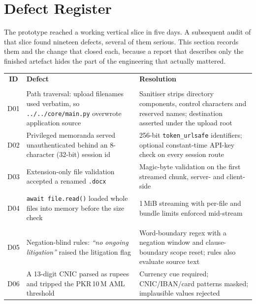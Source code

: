 \documentclass[11pt,a4paper]{article}
\newcommand{\code}[1]{\texttt{\small #1}}
\newcommand{\pkr}{PKR\,}
\begin{document}
\section{Defect Register}
\label{sec:defects}

The prototype reached a working vertical slice in five days. A subsequent audit of that
slice found nineteen defects, several of them serious. This section records them and the
change that closed each, because a report that describes only the finished artefact hides
the part of the engineering that actually mattered.

\begin{table}[H]
\centering\scriptsize
\begin{tabularx}{\linewidth}{@{}>{\ttfamily}c L{5.5cm} X@{}}
\toprule
{}\normalfont\textbf{ID} & \textbf{Defect} & \textbf{Resolution} \\
 \\
\midrule
D01 & Path traversal: upload filenames used verbatim, so \code{../../core/main.py} overwrote application source & Sanitiser strips directory components, control characters and reserved names; destination asserted under the upload root \\
D02 & Privileged memoranda served unauthenticated behind an 8-character (32-bit) session id & 256-bit \code{token\_urlsafe} identifiers; optional constant-time API-key check on every session route \\
D03 & Extension-only file validation accepted a renamed \code{.docx} & Magic-byte validation on the first streamed chunk, server- and client-side \\
D04 & \code{await file.read()} loaded whole files into memory before the size check & 1\,MiB streaming with per-file and bundle limits enforced mid-stream \\
\midrule
{} \\
\midrule
D05 & Negation-blind rules: \emph{``no ongoing litigation''} raised the litigation flag & Word-boundary regex with a negation window and clause-boundary scope reset; rules also evaluate source text \\
D06 & A 13-digit CNIC parsed as rupees and tripped the \pkr 10\,M AML threshold & Currency cue required; CNIC/IBAN/card patterns masked; implausible values rejected \\

\end{tabularx}
\end{table}
\end{document}
